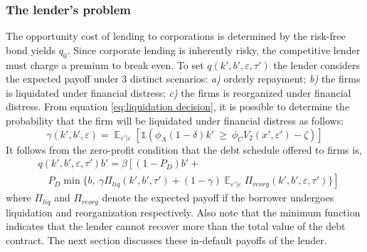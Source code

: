 \documentclass[12pt]{article}
\DeclareMathOperator{\E}{\mathbb{E}}
\begin{document}
\subsubsection{The lender's problem}
The opportunity cost of lending to corporations is determined by the risk-free bond yields $q_0$. Since corporate lending is inherently risky, the competitive lender must charge a premium to break even. To set $q(k',b',\varepsilon, \tau')$ the lender considers the expected payoff under 3 distinct scenarios: \textit{a)} orderly repayment; \textit{b)} the firms is liquidated under financial distress; \textit{c)} the firms is reorganized under financial distress. From equation \ref{eq:liquidation decision}, it is possible to determine the probability that the firm will be liquidated under financial distress as follows: 
\begin{equation} \label{eq:liquidation probability}
    \gamma(k',b',\varepsilon) = \E_{\varepsilon'|\varepsilon}[\mathds{1}(\phi_A (1-\delta) k'  \  \geq \ \phi_C V_2(x',\varepsilon')- \zeta)]  
\end{equation}
It follows from the zero-profit condition that the debt schedule offered to firms is, 
\begin{equation} \label{eq:q}
    \begin{split}
        & q(k',b', \varepsilon, \tau')b' =  \beta \left[ (1-P_D)b' + \right. \\
        & \quad P_D \min \{b, \ \gamma \Pi_{liq}(k',b', \tau') +  \left. (1-\gamma) \E_{\varepsilon'|\varepsilon} \Pi_{reorg}(k',b', \varepsilon, \tau') \} \right] 
    \end{split}
 \end{equation}
where $\Pi_{liq}$ and $\Pi_{reorg}$ denote the expected payoff if the borrower undergoes liquidation and reorganization respectively. Also note that the minimum function indicates that the lender cannot recover more than the total value of the debt contract.  The next section discusses these in-default payoffs of the lender. 
\end{document}
